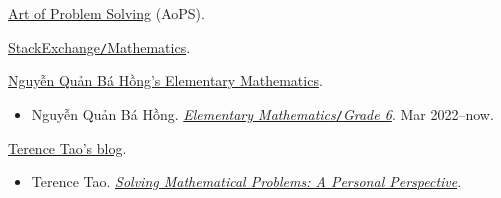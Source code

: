 \documentclass[oneside]{book}
\numberwithin{equation}{section}
\begin{document}
\begin{thebibliography}{99}
	 \href{https://artofproblemsolving.com/}{Art of Problem Solving} (AoPS).
	
	 \href{https://math.stackexchange.com/}{StackExchange\texttt{/}Mathematics}.
	
	 \href{https://github.com/NQBH/hobby/tree/master/elementary_math}{Nguyễn Quản Bá Hồng's Elementary Mathematics}.
	\begin{itemize}
		\item Nguyễn Quản Bá Hồng. \href{https://github.com/NQBH/hobby/blob/master/elementary_math/grade_6/NQBH_elementary_math_grade_6.pdf}{\textit{Elementary Mathematics}\texttt{/}\textit{Grade 6}}. Mar 2022--now.
	\end{itemize}
	
	 \href{https://terrytao.wordpress.com}{Terence Tao's blog}.
	\begin{itemize}
		\item Terence Tao. \href{https://terrytao.wordpress.com/books/solving-mathematical-problems-a-personal-perspective/}{\textit{Solving Mathematical Problems: A Personal Perspective}}.
	\end{itemize}
\end{thebibliography}


\printbibliography[heading=bibintoc]
\end{document}
